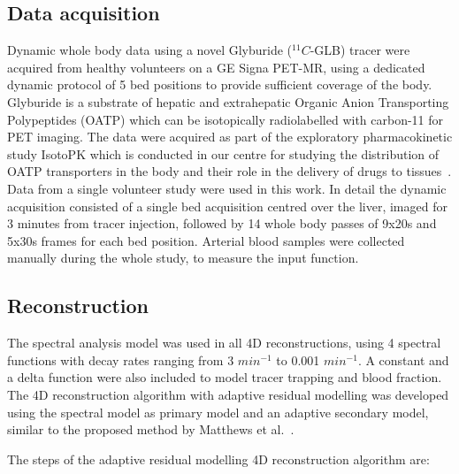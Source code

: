 \subsection{Data acquisition}
Dynamic whole body data using a novel Glyburide (${}^{11}C$-GLB) tracer were acquired from healthy volunteers on a GE Signa PET-MR, using a dedicated dynamic protocol of 5 bed positions to provide sufficient coverage of the body. Glyburide is a substrate of hepatic and extrahepatic Organic Anion Transporting Polypeptides (OATP) which can be isotopically radiolabelled with carbon-11 for PET imaging. The data were acquired as part of the exploratory pharmacokinetic study IsotoPK which is conducted in our centre for studying the distribution of OATP transporters in the body and their role in the delivery of drugs to tissues~\cite{Marie2019}. 
Data from a single volunteer study were used in this work. In detail the dynamic acquisition consisted of a single bed acquisition centred over the liver, imaged for 3 minutes from tracer injection, followed by 14 whole body passes of 9x20s and 5x30s frames for each bed position. 
Arterial blood samples were collected manually during the whole study, to measure the input function.
\subsection{Reconstruction}
The spectral analysis model was used in all 4D reconstructions, using 4 spectral functions with decay rates ranging from 3 \(min^{-1}\) to 0.001 \(min^{-1}\). A constant and a delta function were also included to model tracer trapping and blood fraction. The 4D reconstruction algorithm with adaptive residual modelling was developed using the spectral model as primary model and an adaptive secondary model, similar to the proposed method by Matthews et al.~\cite{Matthews2012}. 
 
The steps of the adaptive residual modelling 4D reconstruction algorithm are:

